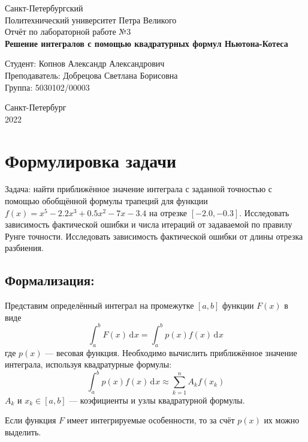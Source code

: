 \documentclass[a4paper]{article}
\newcommand{\dd}[1][]{\ensuremath{\,\mathrm{d}^{#1}}}
\begin{document}
\begin{titlepage}
  \Large
  \begin{center}
    Санкт-Петербургский\\
    Политехнический университет Петра Великого\\
    \vspace{10em}
    Отчёт по лабораторной работе №3\\
    \vspace{2em}
    \textbf{Решение интегралов с помощью квадратурных формул Ньютона-Котеса}
  \end{center}
  \vspace{6em}
  \begin{flushright}
    Студент: Копнов Александр Александрович\\
    Преподаватель: Добрецова Светлана Борисовна\\
    Группа: 5030102/00003
  \end{flushright}
  \vspace{\fill}
  \begin{center}
    Санкт-Петербург\\
    2022
  \end{center}
\end{titlepage}
\pagebreak

\section{Формулировка задачи}\label{sec:S1}
Задача: найти приближённое значение интеграла с заданной точностью с помощью обобщённой формулы трапеций для функции
\(f(x) = x^{5} - 2.2x^3 + 0.5x^2 -7x - 3.4\) на отрезке \([-2.0,-0.3]\). Исследовать зависимость фактической ошибки и
числа итераций от задаваемой по правилу Рунге точности. Исследовать зависимость фактической ошибки от длины отрезка разбиения.
\subsection{Формализация:}\label{subsec:SS1}

Представим определённый интеграл на промежутке \([a,b]\) функции \(F(x)\) в виде \[
  \int_a^b F(x)\dd x = \int_a^b p(x)f(x)\dd x
\]
где \(p(x)\) --- весовая функция. Необходимо вычислить приближённое значение интеграла, используя квадратурные формулы: \[
  \int_a^b p(x)f(x)\dd x \approx \sum_{k=1}^n A_{k}f(x_{k})
\]\(A_{k}\) и \(x_{k} \in [a,b]\) --- коэфициенты и узлы квадратурной формулы.

Если функция \(F\) имеет интегрируемые особенности, то за счёт \(p(x)\) их можно выделить.
\end{document}
